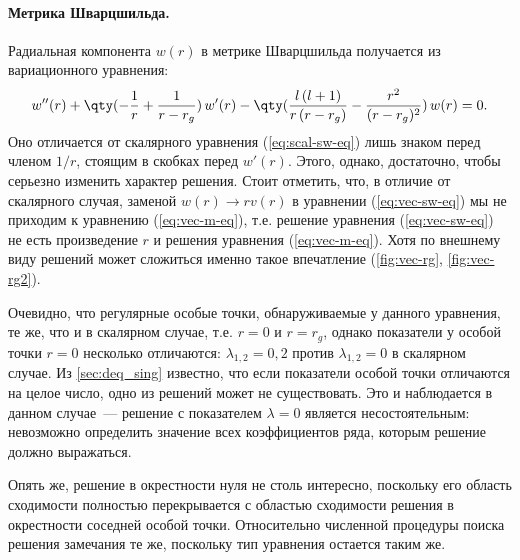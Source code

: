 \documentclass[\docroot/reports/draft/report.tex]{subfiles}
\begin{document}
    \paragraph{Метрика Шварцшильда.}

        Радиальная компонента $w(r)$ в метрике Шварцшильда получается из вариационного уравнения:
        \begin{gather}\label{eq:vec-sw-eq}
            w''(r) + \qty(-\frac{1}{r} + \frac{1}{r - r_g})\, w'(r) - \qty(\frac{l\,(l+1)}{r\, (r-r_g)} - \frac{r^2}{(r-r_g)^2})\, w(r) = 0.
        \end{gather}
        Оно отличается от скалярного уравнения (\ref{eq:scal-sw-eq}) лишь знаком перед членом $1/r$, стоящим в скобках перед $w'(r)$. Этого, однако, достаточно, чтобы серьезно изменить характер решения. Стоит отметить, что, в отличие от скалярного случая, заменой $w(r) \to r v(r)$ в уравнении (\ref{eq:vec-sw-eq}) мы не приходим к уравнению (\ref{eq:vec-m-eq}), т.е. решение уравнения (\ref{eq:vec-sw-eq}) не есть произведение $r$ и решения уравнения (\ref{eq:vec-m-eq}). Хотя по внешнему виду решений может сложиться именно такое впечатление (\autoref{fig:vec-rg}, \autoref{fig:vec-rg2}).

        Очевидно, что регулярные особые точки, обнаруживаемые у данного уравнения, те же, что и в скалярном случае, т.е. $r = 0$ и $r = r_g$, однако показатели у особой точки $r = 0$ несколько отличаются: $\lambda_{1,2} = 0,2$ против $\lambda_{1,2} = 0$ в скалярном случае. Из \autoref{sec:deq_sing} известно, что если показатели особой точки отличаются на целое число, одно из решений может не существовать. Это и наблюдается в данном случае~--- решение с показателем $\lambda = 0$ является несостоятельным: невозможно определить значение всех коэффициентов ряда, которым решение должно выражаться.

        Опять же, решение в окрестности нуля не столь интересно, поскольку его область сходимости полностью перекрывается с областью сходимости решения в окрестности соседней особой точки. Относительно численной процедуры поиска решения замечания те же, поскольку тип уравнения остается таким же.
\end{document}

